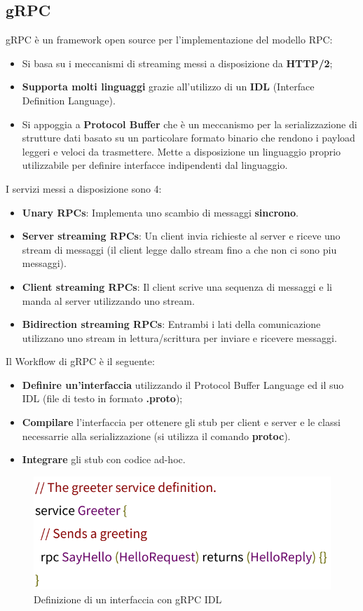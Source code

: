 \documentclass[12pt]{article}
\begin{document}
	\subsection{gRPC}
		gRPC è un framework open source per l'implementazione del modello RPC:
		\begin{itemize}
			\item Si basa su i meccanismi di streaming messi a disposizione da \textbf{ HTTP/2};
			\item \textbf{Supporta molti linguaggi} grazie all'utilizzo di un \textbf{IDL} (Interface Definition Language).
			\item Si appoggia a \textbf{Protocol Buffer} che è un meccanismo per la serializzazione di strutture dati basato su un particolare formato binario che rendono i payload leggeri e veloci da trasmettere. Mette a disposizione un linguaggio proprio utilizzabile per definire interfacce indipendenti dal linguaggio.
		\end{itemize}
		I servizi messi a disposizione sono 4:
		\begin{itemize}
			\item \textbf{Unary RPCs}: Implementa uno scambio di messaggi \textbf{sincrono}.
			\item \textbf{Server streaming RPCs}: Un client invia richieste al server e riceve uno stream di messaggi (il client legge dallo stream fino a che non ci sono piu messaggi).
			\item \textbf{Client streaming RPCs}: Il client scrive una sequenza di messaggi e li manda al server utilizzando uno stream.
			\item \textbf{Bidirection streaming RPCs}: Entrambi i lati della comunicazione utilizzano uno stream in lettura/scrittura per inviare e ricevere messaggi.  
		\end{itemize}
		Il Workflow di gRPC è il seguente:
		\begin{itemize}
			\item \textbf{Definire un'interfaccia} utilizzando il Protocol Buffer Language ed il suo IDL (file di testo in formato \textbf{.proto});
			\item \textbf{Compilare} l'interfaccia per ottenere gli stub per client e server e le classi necessarrie alla serializzazione (si utilizza il comando \textbf{protoc}).
			\item \textbf{Integrare} gli stub con codice ad-hoc.
		\end{itemize}
		\begin{figure}[h!]
			\centering
			\includegraphics[scale=0.30]{img/idl.png}
			\caption{Definizione di un interfaccia con gRPC IDL}
		\end{figure}
\end{document}
